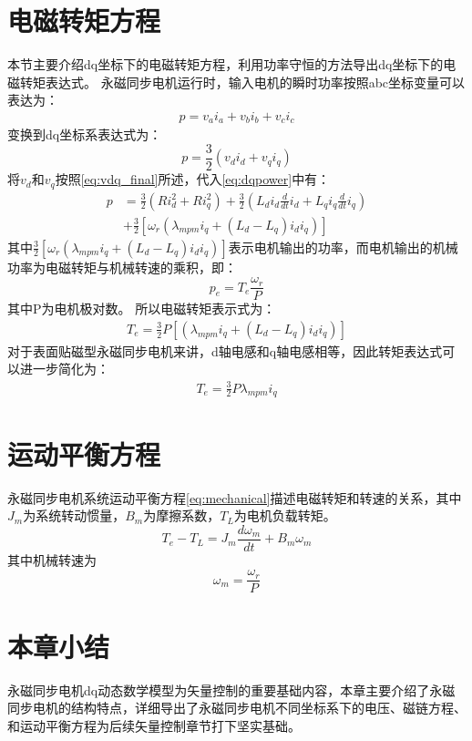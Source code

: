 \section{电磁转矩方程}
本节主要介绍dq坐标下的电磁转矩方程，利用功率守恒的方法导出dq坐标下的电磁转矩表达式。
永磁同步电机运行时，输入电机的瞬时功率按照abc坐标变量可以表达为：
\begin{align}
p = v_{a}i_{a}+v_{b}i_{b}+v_{c}i_{c}
\end{align}
变换到dq坐标系表达式为：
\begin{equation}\label{eq:dqpower}
p = \frac{3}{2}(v_{d}i_{d}+v_{q}i_{q})
\end{equation}
将$v_{d}$和$v_{q}$按照\ref{eq:vdq_final}所述，代入\ref{eq:dqpower}中有：
\begin{align}
p&=\frac{3}{2}(Ri_{d}^2+Ri_{q}^2)+\frac{3}{2}(L_{d}i_{d}\frac{d}{dt}i_{d}+L_{q}i_{q}\frac{d}{dt}i_{q})\nonumber\\
&+\frac{3}{2}\left[\omega_{r}\left(\lambda_{mpm}i_{q}+(L_{d}-L_{q})i_{d}i_{q}\right)\right]
\end{align}
其中$\frac{3}{2}\left[\omega_{r}\left(\lambda_{mpm}i_{q}+(L_{d}-L_{q})i_{d}i_{q}\right)\right]$表示电机输出的功率，而电机输出的机械功率为电磁转矩与机械转速的乘积，即：
\begin{equation}
p_{e}=T_{e}\frac{\omega_{r}}{P}
\end{equation}
其中P为电机极对数。
所以电磁转矩表示式为：
\begin{align}
T_{e}=\frac{3}{2}P\left[\left(\lambda_{mpm}i_{q}+(L_{d}-L_{q})i_{d}i_{q}\right)\right]
\end{align}
对于表面贴磁型永磁同步电机来讲，d轴电感和q轴电感相等，因此转矩表达式可以进一步简化为：
\begin{align}
T_{e}=\frac{3}{2}P\lambda_{mpm}i_{q}
\end{align}
\section{运动平衡方程}
永磁同步电机系统运动平衡方程\ref{eq:mechanical}描述电磁转矩和转速的关系，其中$J_{m}$为系统转动惯量，$B_{m}$为摩擦系数，$T_{L}$为电机负载转矩。
\begin{equation}\label{eq:mechanical}
T_{e}-T_{L}=J_{m}\frac{d\omega_{m}}{dt}+B_{m}\omega_{m} 
\end{equation}
其中机械转速为
\begin{equation}
\omega_{m} = \frac{\omega_{r}}{P}
\end{equation}
\section{本章小结}
永磁同步电机dq动态数学模型为矢量控制的重要基础内容，本章主要介绍了永磁同步电机的结构特点，详细导出了永磁同步电机不同坐标系下的电压、磁链方程、和运动平衡方程为后续矢量控制章节打下坚实基础。